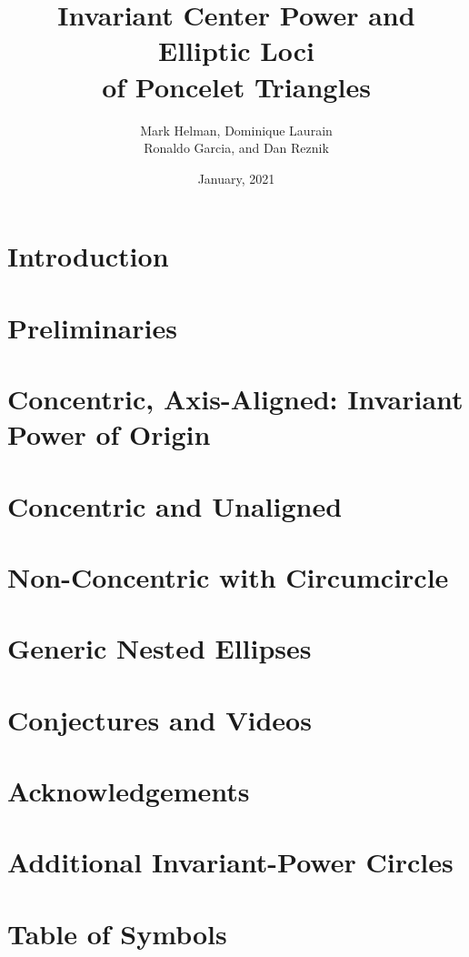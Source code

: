 \documentclass{amsart}
\title[Poncelet Center Power and Loci]{Invariant Center Power and Elliptic Loci\\of Poncelet Triangles}
\author[Helman, Laurain, Garcia, and Reznik]{Mark Helman, Dominique Laurain\\Ronaldo Garcia, and Dan Reznik}
\date{January, 2021}
\begin{document}
\maketitle



\section{Introduction}
\label{sec:intro}


\section{Preliminaries}
\label{sec:preliminaries}


\section{Concentric, Axis-Aligned: Invariant Power of Origin}
\label{sec:axis-aligned}


\section{Concentric and Unaligned}
\label{sec:concentric-tilted}


\section{Non-Concentric with Circumcircle}
\label{sec:nonconcentric-circumcircle}


\section{Generic Nested Ellipses}
\label{sec:nonconcentric-tilted}


\section{Conjectures and Videos}
\label{sec:open-questions}


\section*{Acknowledgements}


\appendix

\section{Additional Invariant-Power Circles}
\label{app:four-more}


\section{Table of Symbols}
\label{app:symbols}




\end{document}
